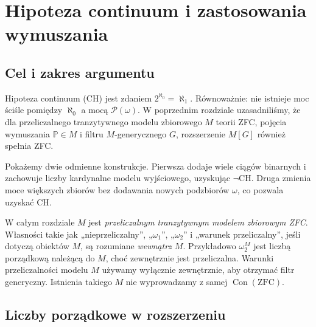 \chapter{Hipoteza continuum i zastosowania wymuszania}
\label{ch:forcing-continuum}

\section{Cel i zakres argumentu}
Hipoteza continuum (CH) jest zdaniem
$2^{\aleph_0}=\aleph_1$. Równoważnie:
nie istnieje moc ściśle pomiędzy
$\aleph_0$ a mocą $\mathcal P(\omega)$.
W poprzednim rozdziale uzasadniliśmy,
że dla przeliczalnego tranzytywnego
modelu zbiorowego $M$ teorii ZFC,
pojęcia wymuszania $\mathbb P\in M$
i filtru $M$-generycznego $G$,
rozszerzenie $M[G]$ również spełnia ZFC.

Pokażemy dwie odmienne konstrukcje.
Pierwsza dodaje wiele ciągów binarnych
i zachowuje liczby kardynalne modelu
wyjściowego, uzyskując $\neg\mathrm{CH}$.
Druga zmienia moce większych zbiorów
bez dodawania nowych podzbiorów $\omega$,
co pozwala uzyskać CH.

\begin{uwaga}
\label{rem:forcing34-perspective}
W całym rozdziale $M$ jest
\emph{przeliczalnym tranzytywnym modelem
zbiorowym ZFC}. Własności
takie jak „nieprzeliczalny”,
„$\omega_1$”, „$\omega_2$” i
„warunek przeliczalny”,
jeśli dotyczą obiektów $M$,
są rozumiane \emph{wewnątrz $M$}.
Przykładowo $\omega_2^M$ jest
liczbą porządkową należącą do $M$,
choć zewnętrznie jest przeliczalna.
Warunki przeliczalności modelu $M$
używamy wyłącznie zewnętrznie, aby
otrzymać filtr generyczny.
Istnienia takiego $M$ nie wyprowadzamy
z samej $\operatorname{Con}(\mathrm{ZFC})$.
\end{uwaga}

\section{Liczby porządkowe w rozszerzeniu}

